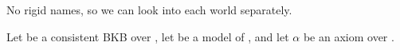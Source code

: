 No rigid names, so we can look into each world separately.






\begin{lemma}
  Let \Bmf be a consistent BKB over \Nsig, let \I be a model of \Bmf, and let $\alpha$ be an axiom
  over \Nsig. 
\end{lemma}











